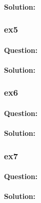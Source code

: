 \documentclass[a4paper,12pt,titlepage]{article} %
\begin{document}
\paragraph{Solution:}

\subsubsection{ex5}
\paragraph{Question:}

\paragraph{Solution:}

\subsubsection{ex6}
\paragraph{Question:}

\paragraph{Solution:}

\subsubsection{ex7}
\paragraph{Question:}

\paragraph{Solution:}

\end{document}
